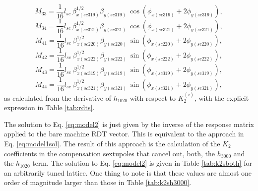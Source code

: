 \begin{equation}
    M_{33}=\frac{1}{16} l_{sc} \: \beta^{1/2}_{x(sc319)} \beta_{y(sc319)} \: \cos \left( \phi_{x(sc319)} + 2\phi_{y(sc319)} \right),
    \label{eq:M33}
\end{equation}
\begin{equation}
    M_{34}=\frac{1}{16} l_{sc} \: \beta^{1/2}_{x(sc321)} \beta_{y(sc321)} \: \cos \left( \phi_{x(sc321)} + 2\phi_{y(sc321)} \right),
    \label{eq:M34}
\end{equation}
\begin{equation}
    M_{41}=\frac{1}{16} l_{sc} \: \beta^{1/2}_{x(sc220)} \beta_{y(sc220)} \: \sin \left( \phi_{x(sc220)} + 2\phi_{y(sc220)} \right),
    \label{eq:M41}
\end{equation}
\begin{equation}
    M_{42}=\frac{1}{16} l_{sc} \: \beta^{1/2}_{x(sc222)} \beta_{y(sc222)} \: \sin \left( \phi_{x(sc222)} + 2\phi_{y(sc222)} \right),
    \label{eq:M42}
\end{equation}
\begin{equation}
    M_{43}=\frac{1}{16} l_{sc} \: \beta^{1/2}_{x(sc319)} \beta_{y(sc319)} \: \sin \left( \phi_{x(sc319)} + 2\phi_{y(sc319)} \right),
    \label{eq:M43}
\end{equation}
\begin{equation}
    M_{44}=\frac{1}{16} l_{sc} \: \beta^{1/2}_{x(sc321)} \beta_{y(sc321)} \: \sin \left( \phi_{x(sc321)} + 2\phi_{y(sc321)} \right),
    \label{eq:M44}
\end{equation}
as calculated from the derivative of $h_{1020}$ with respect to $K_2^{(i)}$, with the explicit expression in Table \ref{tab:rdts}.

The solution to Eq. \ref{eq:model2} is just given by the inverse of the response matrix applied to the bare machine RDT vector. This is equivalent to the approach in Eq. \ref{eq:model1sol}. The result of this approach is the calculation of the $K_2$ coefficients in the compensation sextupoles that cancel out, both, the $h_{3000}$ and the $h_{1020}$ term. The solution to Eq. \ref{eq:model2} is given in Table \ref{tab:k2sboth} for an arbitrarily tuned lattice. One thing to note is that these values are almost one order of magnitude larger than those in Table \ref{tab:k2sh3000}. 

